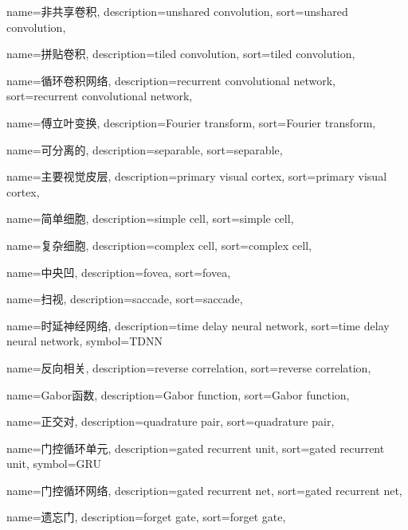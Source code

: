 {
  name=非共享卷积,
  description={unshared convolution},
  sort={unshared convolution},
}

{
  name=拼贴卷积,
  description={tiled convolution},
  sort={tiled convolution},
}

{
  name=循环卷积网络,
  description={recurrent convolutional network},
  sort={recurrent convolutional network},
}

{
  name=傅立叶变换,
  description={Fourier transform},
  sort={Fourier transform},
}

{
  name=可分离的,
  description={separable},
  sort={separable},
}

{
  name=主要视觉皮层,
  description={primary visual cortex},
  sort={primary visual cortex},
}

{
  name=简单细胞,
  description={simple cell},
  sort={simple cell},
}

{
  name=复杂细胞,
  description={complex cell},
  sort={complex cell},
}

{
  name=中央凹,
  description={fovea},
  sort={fovea},
}

{
  name=扫视,
  description={saccade},
  sort={saccade},
}

{
  name=时延神经网络,
  description={time delay neural network},
  sort={time delay neural network},
  symbol={TDNN}
}

{
  name=反向相关,
  description={reverse correlation},
  sort={reverse correlation},
}

{
  name=Gabor函数,
  description={Gabor function},
  sort={Gabor function},
}

{
  name=正交对,
  description={quadrature pair},
  sort={quadrature pair},
}

{
  name=门控循环单元,
  description={gated recurrent unit},
  sort={gated recurrent unit},
  symbol={GRU}
}

{
  name=门控循环网络,
  description={gated recurrent net},
  sort={gated recurrent net}, 
}

{
  name=遗忘门,
  description={forget gate},
  sort={forget gate},
}


